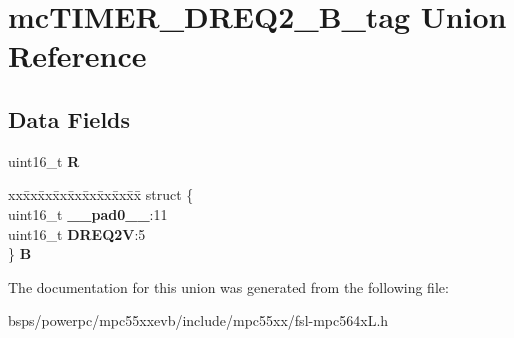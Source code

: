 \hypertarget{unionmcTIMER__DREQ2__16B__tag}{}\section{mc\+T\+I\+M\+E\+R\+\_\+\+D\+R\+E\+Q2\+\_\+B\+\_\+tag Union Reference}
\label{unionmcTIMER__DREQ2__16B__tag}
\subsection*{Data Fields}
\begin{DoxyCompactItemize}
\item 
\mbox{\label{unionmcTIMER__DREQ2__16B__tag_a9e7f678485a86db2b4ff313bfc5614f3}} 
uint16\+\_\+t {\bfseries R}
\item 
\mbox{\label{unionmcTIMER__DREQ2__16B__tag_a68b67cab2bd8e95263f514d5f561a335}} 
\begin{tabbing}
xx\=xx\=xx\=xx\=xx\=xx\=xx\=xx\=xx\=\kill
struct \{\\
\>uint16\_t {\bfseries \_\_pad0\_\_}:11\\
\>uint16\_t {\bfseries DREQ2V}:5\\
\} {\bfseries B}\\

\end{tabbing}\end{DoxyCompactItemize}


The documentation for this union was generated from the following file\+:\begin{DoxyCompactItemize}
\item 
bsps/powerpc/mpc55xxevb/include/mpc55xx/fsl-\/mpc564x\+L.\+h\end{DoxyCompactItemize}
